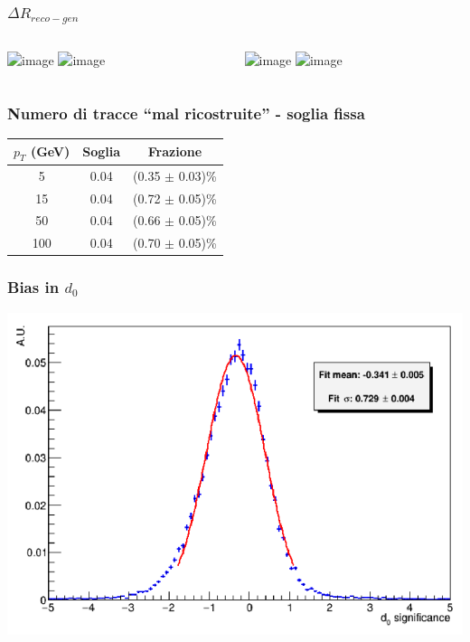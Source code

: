 \documentclass{beamer}
\begin{document}
\begin{frame}
\frametitle{$\Delta R_{reco-gen}$}

\begin{columns}
\begin{column}{.5\textwidth}
\centering
\includegraphics<1>[width=\textwidth, height=4.5cm]{Tracking/pi15pu0_matchingDR}
\includegraphics<2>[width=\textwidth, height=4.5cm]{Tracking/pi50pu0_matchingDR}

\end{column}
\begin{column}{.5\textwidth}
\centering
\includegraphics<1>[width=\textwidth, height=4.5cm]{Tracking/mu15pu0_matchingDR}
\includegraphics<2>[width=\textwidth, height=4.5cm]{Tracking/mu50pu0_matchingDR}
\end{column}
\end{columns}
\end{frame}



\begin{frame}
\frametitle{Numero di tracce ``mal ricostruite'' - soglia fissa}
\centering
\begin{tabular}{ c | c | c }
\boldmath$p_{T}$ (GeV) & \textbf{Soglia} & \textbf{Frazione} \\ \hline \hline 
5 & 0.04 & (0.35 $\pm$ 0.03)\% \\ \hline
15 & 0.04 & (0.72 $\pm$ 0.05)\% \\ \hline
50 & 0.04 & (0.66 $\pm$ 0.05)\% \\ \hline
100 & 0.04 & (0.70 $\pm$ 0.05)\% \\ \hline
\end{tabular}
\end{frame}



\begin{frame}
\frametitle{Bias in $d_{0}$}
\centering
\includegraphics[width=.9\textwidth]{Tracking/pull_d0}
\end{frame}
\end{document}
